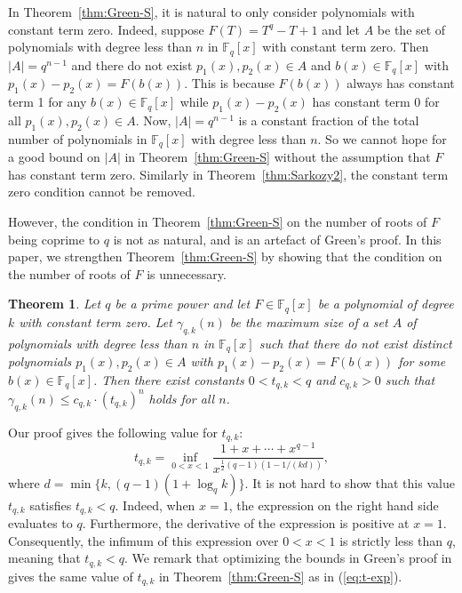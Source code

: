 \documentclass[11pt, reqno]{amsart}
\newtheorem{theorem}{Theorem}[section]
\theoremstyle{definition}
\newcommand{\F}{\mathbb{F}}
\begin{document}
In Theorem~\ref{thm:Green-S}, it is natural to only consider polynomials with constant term zero. Indeed, suppose $F(T) = T^q - T +1$ and let $A$ be the set of polynomials with degree less than $n$ in $\F_q[x]$ with constant term zero. Then $|A| = q^{n-1}$ and there do not exist $p_1(x), p_2(x) \in A$ and $b(x) \in \F_q[x]$ with $p_1(x) - p_2(x) = F(b(x))$. This is because $F(b(x))$ always has constant term 1 for any $b(x) \in \F_q[x]$ while $p_1(x) - p_2(x)$ has constant term 0 for all $p_1(x), p_2(x) \in A$. Now, $|A|=q^{n-1}$ is a constant fraction of the total number of polynomials in $\F_q[x]$ with degree less than $n$. So we cannot hope for a good bound on $|A|$ in Theorem~\ref{thm:Green-S} without the assumption that $F$ has constant term zero. Similarly in Theorem~\ref{thm:Sarkozy2}, the constant term zero condition cannot be removed.

However, the condition in Theorem~\ref{thm:Green-S} on the number of roots of $F$ being coprime to $q$ is not as natural, and is an artefact of Green's proof. In this paper, we strengthen Theorem~\ref{thm:Green-S} by showing that the condition on the number of roots of $F$ is unnecessary.


\begin{theorem}\label{thm:S}
Let $q$ be a prime power and let $F \in \F_q[x]$ be a polynomial of degree $k$ with constant term zero.  Let $\gamma_{q,k}(n)$ be the maximum size of a set $A$ of polynomials with degree less than $n$ in $\F_q[x]$ such that there do not exist distinct polynomials $p_1(x),p_2(x) \in A$ with $p_1(x) - p_2(x) = F(b(x))$ for some $b(x) \in \F_q[x]$. Then there exist constants $0<t_{q,k} < q$ and $c_{q,k} > 0$ such that $\gamma_{q,k}(n) \le c_{q,k} \cdot (t_{q,k})^n$ holds for all $n$.
\end{theorem}

Our proof gives the following value for $t_{q,k}$:
\begin{equation}\label{eq:t-exp}
 t_{q,k} = \inf\limits_{0 < x < 1} \frac{1+x+ \cdots + x^{q-1}}{x^{\frac{1}{2}(q-1)(1- 1/(kd))}},
\end{equation}
where $d=\min \{k, (q-1)(1 + \log_q k)\}$. It is not hard to show that this value $t_{q,k}$ satisfies $t_{q,k} < q$. Indeed, when $x = 1$, the expression on the right hand side evaluates to $q$. Furthermore, the derivative of the expression is positive at $x=1$. Consequently, the infimum of this expression over $0 < x < 1$ is strictly less than $q$, meaning that $t_{q,k} < q$. We remark that optimizing the bounds in Green's proof in \cite{G17} gives the same value of $t_{q,k}$ in Theorem~\ref{thm:Green-S} as in (\ref{eq:t-exp}).
\end{document}
